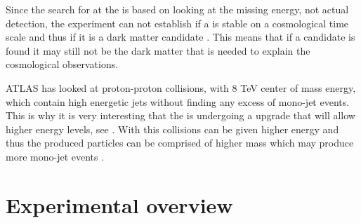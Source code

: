 Since the search for \abbrWIMPS at the \abbrLHC is based on looking at the missing energy, not actual detection, the experiment can not establish if a \abbrWIMP is stable on a cosmological time scale and thus if it is a dark matter candidate \citep{CERN-PH-EP-2012-210}. This means that if a candidate is found it may still not be the dark matter that is needed to explain the cosmological observations.

ATLAS has looked at proton-proton collisions, with 8 TeV center of mass energy, which contain high energetic jets without finding any excess of mono-jet events. This is why it is very interesting that the \abbrLHC is undergoing a upgrade that will allow higher energy levels, see . With this collisions can be given higher energy and thus the produced particles can be comprised of higher mass which may produce more mono-jet events \citep{ATLAS:LOI2}.
\newpage
\section{Experimental overview}\label{sec:experiment}
